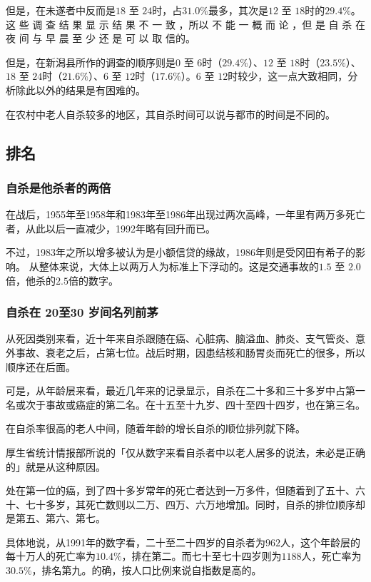 \documentclass[UTF8]{ctexart}
\begin{document}
但是，在未遂者中反而是$18$ 至 $24$时，占$31.0\%$最多，其次是$12$ 至 $18$时的$29.4\%$。 这 些 调 查 结 果 显 示 结 果 不 一 致 ，所以 不 能 一 概 而 论 ，但 是 自 杀 在 夜 间 与 早 晨 至 少 还 是 可 以 取 信的。

但是，在新潟县所作的调查的顺序则是$0$ 至 $6$时（$29.4\%$）、$12$ 至 $18$时（$23.5\%$）、$18$ 至 $24$时（$21.6\%$）、$6$ 至 $12$时（$17.6\%$）。$6$ 至 $12$时较少，这一点大致相同，分析除此以外的结果是有困难的。

在农村中老人自杀较多的地区，其自杀时间可以说与都市的时间是不同的。

\subsection{排名}

\subsubsection*{自杀是他杀者的两倍}

在战后，1955年至1958年和1983年至1986年出现过两次高峰，一年里有两万多死亡者，从此以后一直减少，1992年略有回升而已。

不过，1983年之所以增多被认为是小额信贷的缘故，1986年则是受冈田有希子的影响。
从整体来说，大体上以两万人为标准上下浮动的。这是交通事故的$1.5$ 至 $2.0$倍，他杀的$2.5$倍的数字。

\subsubsection*{自杀在 20至30 岁间名列前茅}

从死因类别来看，近十年来自杀跟随在癌、心脏病、脑溢血、肺炎、支气管炎、意外事故、衰老之后，占第七位。战后时期，因患结核和肠胃炎而死亡的很多，所以顺序还在后面。

可是，从年龄层来看，最近几年来的记录显示，自杀在二十多和三十多岁中占第一名或次于事故或癌症的第二名。在十五至十九岁、四十至四十四岁，也在第三名。

在自杀率很高的老人中间，随着年龄的增长自杀的顺位排列就下降。

厚生省统计情报部所说的「仅从数字来看自杀者中以老人居多的说法，未必是正确的」就是从这种原因。

处在第一位的癌，到了四十多岁常年的死亡者达到一万多件，但随着到了五十、六十、七十多岁，其死亡数则以二万、四万、六万地增加。同时，自杀的排位顺序却是第五、第六、第七。

具体地说，从1991年的数字看，二十至二十四岁的自杀者为$962$人，这个年龄层的每十万人的死亡率为$10.4\%$，排在第二。而七十至七十四岁则为$1188$人，死亡率为$30.5\%$，排名第九。的确，按人口比例来说自指数是高的。
\end{document}

